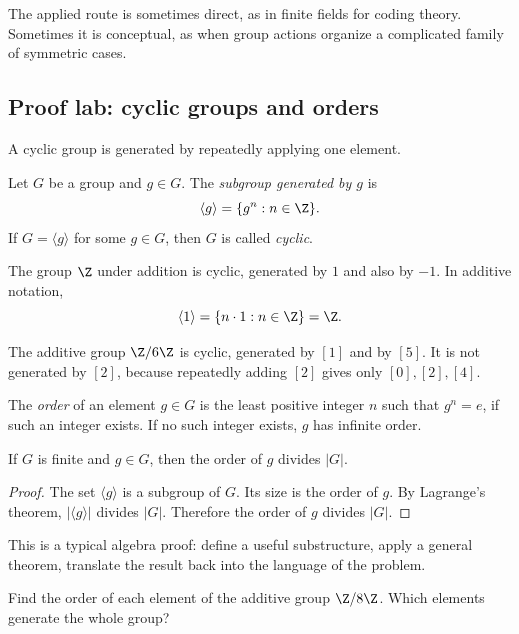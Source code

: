 The applied route is sometimes direct, as in finite fields for coding theory.
Sometimes it is conceptual, as when group actions organize a complicated family
of symmetric cases.

\subsection{Proof lab: cyclic groups and orders}

A cyclic group is generated by repeatedly applying one element.

\begin{definition}
Let $G$ be a group and $g\in G$. The \emph{subgroup generated by $g$} is
\[
\langle g\rangle=\{g^n:n\in\Z\}.
\]
If $G=\langle g\rangle$ for some $g\in G$, then $G$ is called \emph{cyclic}.
\end{definition}

\begin{example}
The group $\Z$ under addition is cyclic, generated by $1$ and also by $-1$.
In additive notation,
\[
\langle 1\rangle=\{n\cdot 1:n\in\Z\}=\Z.
\]
\end{example}

\begin{example}
The additive group $\Z/6\Z$ is cyclic, generated by $[1]$ and by $[5]$. It is
not generated by $[2]$, because repeatedly adding $[2]$ gives only
$[0],[2],[4]$.
\end{example}

\begin{definition}
The \emph{order} of an element $g\in G$ is the least positive integer $n$ such
that $g^n=e$, if such an integer exists. If no such integer exists, $g$ has
infinite order.
\end{definition}

\begin{theorem}
If $G$ is finite and $g\in G$, then the order of $g$ divides $|G|$.
\end{theorem}

\begin{proof}
The set $\langle g\rangle$ is a subgroup of $G$. Its size is the order of $g$.
By Lagrange's theorem, $|\langle g\rangle|$ divides $|G|$. Therefore the order
of $g$ divides $|G|$.
\end{proof}

This is a typical algebra proof: define a useful substructure, apply a general
theorem, translate the result back into the language of the problem.

\begin{labbox}
Find the order of each element of the additive group $\Z/8\Z$. Which elements
generate the whole group?
\end{labbox}


